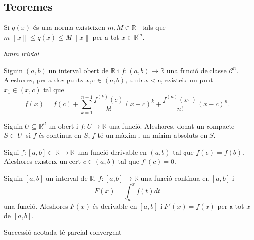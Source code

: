 \documentclass[../../Main.tex]{subfiles}
\begin{document}
	\subsection{Teoremes}
	\begin{theorem}
		\label{thm:Equivalència de normes}
		Si \(q(x)\) és una norma existeixen \(m,M\in\mathbb{R}^{+}\) tals que \(m\left\lVert x\right\rVert\leq q(x)\leq M\left\lVert x\right\rVert\) per a tot \(x\in\mathbb{R}^{m}\).
	\end{theorem}
	\begin{theorem}
		\label{Teorema del Valor Mig}\label{thm:TVM}
		\emph{hmm trivial}
	\end{theorem}
	\begin{theorem}
		\label{thm:Desigualtat de C-S}
	\end{theorem}
	\begin{theorem}%
		\label{thm:Teorema de Taylor} %
		Siguin \((a,b)\) un interval obert de \(\mathbb{R}\) i \(f\colon(a,b)\rightarrow\mathbb{R}\) una funció de classe \(\mathcal{C}^{n}\). Aleshores, per a dos punts \(x,c\in(a,b)\), amb \(x<c\), existeix un punt \(x_{1}\in(x,c)\) tal que
		\[f(x)=f(c)+\sum_{k=1}^{n-1}\frac{f^{(k)}(c)}{k!}(x-c)^{k}+\frac{f^{(n)}(x_{1})}{n!}(x-c)^{n}.\]
	\end{theorem}
	\begin{theorem}
		\label{thm:Weierstrass màxims i mínims múltiples variables}
		Siguin \(U\subseteq\mathbb{R}^{d}\) un obert i \(f\colon U\to\mathbb{R}\) una funció. Aleshores, donat un compacte \(S\subset U\), si \(f\) és contínua en \(S\), \(f\) té un màxim i un mínim absoluts en \(S\).
	\end{theorem}
	\begin{theorem}
		\label{thm:sandvitx}
	\end{theorem}
	\begin{theorem}
		\label{thm:Teorema de Rolle}
		Sigui \(f\colon[a,b]\subset\mathbb{R}\longrightarrow\mathbb{R}\) una funció derivable en \((a,b)\) tal que \(f(a)=f(b)\). Aleshores existeix un cert \(c\in(a,b)\) tal que \(f'(c)=0\).
	\end{theorem}
	\begin{theorem}
		\label{thm:Teorema Fonamental del Càlcul}
		Siguin \([a,b]\) un interval de \(\mathbb{R}\), \(f\colon[a,b]\longrightarrow\mathbb{R}\) una funció contínua en \([a,b]\) i
		\[F(x)=\int_{a}^{x}f(t)dt\]
		una funció. Aleshores \(F(x)\) és derivable en \([a,b]\) i \(F'(x)=f(x)\) per a tot \(x\) de \([a,b]\).
	\end{theorem}
	\begin{theorem}
		\label{thm:Teorema de Bolzano-Weierstrass}
		Successió acotada té parcial convergent
	\end{theorem}
\end{document}
